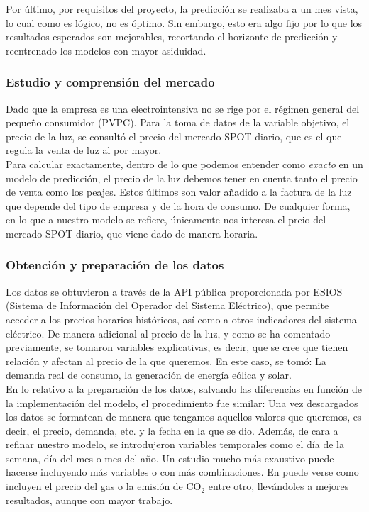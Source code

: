 Por último, por requisitos del proyecto, la predicción se realizaba a un mes vista, lo cual como es lógico, no es óptimo. Sin embargo, esto era algo fijo por lo que los resultados esperados son mejorables, recortando el horizonte de predicción y reentrenado los modelos con mayor asiduidad.
%
%
%
\subsubsection{Estudio y comprensión del mercado}
%
%
%
Dado que la empresa es una electrointensiva no se rige por el régimen general del pequeño consumidor (PVPC). Para la toma de datos de la variable objetivo, el precio de la luz, se consultó el precio del mercado SPOT diario, que es el que regula la venta de luz al por mayor.\\

Para calcular exactamente, dentro de lo que podemos entender como \textit{exacto} en un modelo de predicción, el precio de la luz debemos tener en cuenta tanto el precio de venta como los peajes. Estos últimos son valor añadido a la factura de la luz que depende del tipo de empresa y de la hora de consumo. De cualquier forma, en lo que a nuestro modelo se refiere, únicamente nos interesa el preio del mercado SPOT diario, que viene dado de manera horaria.
%
%
%
\subsubsection{Obtención y preparación de los datos}
%
%
%
Los datos se obtuvieron a través de la API pública proporcionada por ESIOS (Sistema de Información del Operador del Sistema Eléctrico), que permite acceder a los precios horarios históricos, así como a otros indicadores del sistema eléctrico. De manera adicional al precio de la luz, y como se ha comentado previamente, se tomaron variables explicativas, es decir, que se cree que tienen relación y afectan al precio de la que queremos. En este caso, se tomó: La demanda real de consumo, la generación de energía eólica y solar.\\

En lo relativo a la preparación de los datos, salvando las diferencias en función de la implementación del modelo, el procedimiento fue similar: Una vez descargados los datos se formatean de manera que tengamos aquellos valores que queremos, es decir, el precio, demanda, etc. y la fecha en la que se dio. Además, de cara a refinar nuestro modelo, se introdujeron variables temporales como el día de la semana, día del mes o mes del año. Un estudio mucho más exaustivo puede hacerse incluyendo más variables o con más combinaciones. En \cite{TFG_prediccion} puede verse como incluyen el precio del gas o la emisión de CO$_2$ entre otro, llevándoles a mejores resultados, aunque con mayor trabajo.
%
%
%
